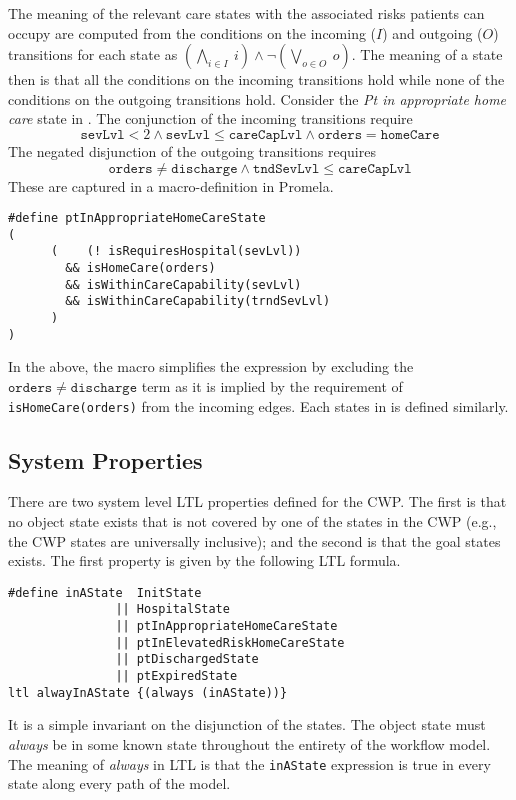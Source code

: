 The meaning of the relevant care states with the associated risks patients can occupy are computed from the conditions on the incoming ($I$) and outgoing ($O$) transitions for each state as $(\bigwedge_{i \in I}\ i) \wedge \neg(\bigvee_{o \in O}\ o)$. The meaning of a state then is that all the conditions on the incoming transitions hold while none of the conditions on the outgoing transitions hold. Consider the \emph{Pt in appropriate home care} state in . The conjunction of the incoming transitions require
%
\[
  \mathtt{sevLvl} < 2 \wedge \mathtt{sevLvl} \le \mathtt{careCapLvl} \wedge \mathtt{orders} = \mathtt{homeCare}
\]
%
The negated disjunction of the outgoing transitions requires
%
\[
  \mathtt{orders} \neq \mathtt{discharge} \wedge \mathtt{tndSevLvl} \le \mathtt{careCapLvl}
\]
%
\noindent These are captured in a macro-definition in Promela.
%
{\small
\begin{lstlisting}[style=myPromela]
#define ptInAppropriateHomeCareState
(
      (    (! isRequiresHospital(sevLvl))
        && isHomeCare(orders)                                      
        && isWithinCareCapability(sevLvl)
        && isWithinCareCapability(trndSevLvl)
      )
)
\end{lstlisting}
}
%
\noindent In the above, the macro simplifies the expression by excluding the $\mathtt{orders} \neq \mathtt{discharge}$ term as it is implied by the requirement of \texttt{isHomeCare(orders)} from the incoming edges. Each states in  is defined similarly.

\subsection{System Properties}
There are two system level LTL properties defined for the CWP. The first is that no object state exists that is not covered by one of the states in the CWP (e.g., the CWP states are universally inclusive); and the second is that the goal states exists. The first property is given by the following LTL formula.
%
{\small
\begin{lstlisting}[style=myPromela]
#define inAState  InitState
               || HospitalState
               || ptInAppropriateHomeCareState
               || ptInElevatedRiskHomeCareState
               || ptDischargedState
               || ptExpiredState
ltl alwayInAState {(always (inAState))}
\end{lstlisting}
}
%
\noindent It is a simple invariant on the disjunction of the states. The object state must \emph{always} be in some known state throughout the entirety of the workflow model. The meaning of \emph{always} in LTL is that the \texttt{inAState} expression is true in every state along every path of the model.

